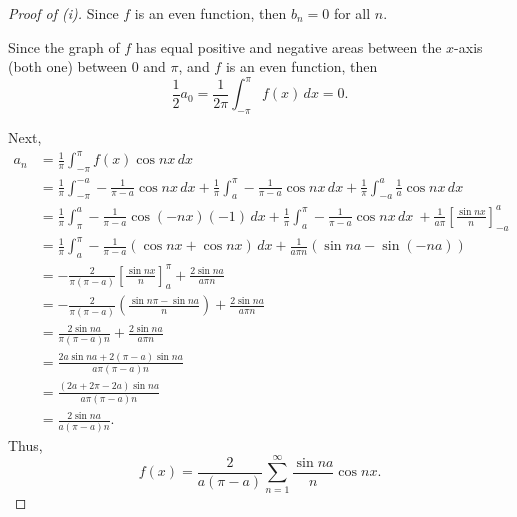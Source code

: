 \documentclass[../hw5]{subfiles}
\begin{document}
\begin{proof}[Proof of (i)]
	Since $f$ is an even function, then  $b_n=0$ for all  $n$.

	Since the graph of $f$ has equal positive and negative areas between the $x$-axis (both one) between 0 and $\pi$, and $f$ is an even function, then \[
		\frac{1}{2}a_0=\frac{1}{2\pi}\int_{-\pi}^{\pi} f(x) \,dx = 0
		.\]

	Next,
	\begin{align*}
		a_n & = \frac{1}{\pi}\int_{-\pi}^{\pi} f(x) \cos{nx }  \,dx                                               \\
		    & = \frac{1}{\pi}\int_{-\pi}^{-a} -\frac{1}{\pi-a}\cos{nx}  \,dx
		+ \frac{1}{\pi}\int_{a}^{\pi} -\frac{1}{\pi-a}\cos{nx } \,dx
		+ \frac{1}{\pi}\int_{-a }^{a} \frac{1}{a}\cos{nx } \,dx                                                   \\
		    & = \frac{1}{\pi}\int_{\pi}^{a} -\frac{1}{\pi-a}\cos{(-nx)}(-1) \,dx
		+ \frac{1}{\pi}\int_{a}^{\pi} -\frac{1}{\pi-a}\cos{nx} \,dx\
		+ \frac{1}{a\pi}{\left[ \frac{\sin{nx} }{n}\right]}_{-a}^{a}                                              \\
		    & = \frac{1}{\pi}\int_{a}^{\pi} -\frac{1}{\pi-a}(\cos{nx}+\cos{nx}) \,dx
		+ \frac{1}{a \pi n}(\sin{na}-\sin{(-na)}  )                                                               \\
		    & = -\frac{2}{\pi(\pi-a)}{\left[ \frac{\sin{nx} }{n} \right] }_a^{\pi}+ \frac{2\sin{na} }{a \pi n}    \\
		    & = -\frac{2}{\pi(\pi-a)}\left( \frac{\sin{n\pi} - \sin{na} }{n} \right) + \frac{2\sin{na} }{a \pi n} \\
		    & = \frac{2\sin{na} }{\pi(\pi-a)n}+\frac{2\sin{na} }{a \pi n}                                         \\
		    & = \frac{2a \sin{na} + 2(\pi-a)\sin{na} }{a \pi (\pi - a) n}                                         \\
		    & = \frac{(2a+2\pi-2a)\sin{na} }{a \pi (\pi-a) n}                                                     \\
		    & = \frac{2\sin{na}}{a (\pi-a ) n}
		.\end{align*}
	Thus, \[
		f(x)=\frac{2}{a(\pi-a)}\sum_{n=1}^{\infty} \frac{\sin{na} }{n}\cos{nx}
		.\]
\end{proof}
\end{document}
